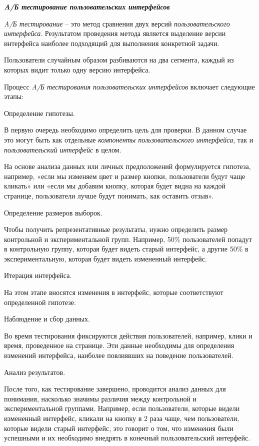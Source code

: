 {\textbf{\textit{A/Б тестирование пользовательских интерфейсов}}

\textit{A/Б тестирование} -- это метод сравнения двух версий \textit{пользовательского интерфейса}. Результатом проведения метода является выделение версии интерфейса наиболее подходящий для выполнения конкретной задачи.

Пользователи случайным образом разбиваются на два сегмента, каждый из которых видит только одну версию интерфейса.

Процесс \textit{A/Б тестирования пользовательских интерфейсов} включает следующие этапы:

\begin{textitemize}
	\item Определение гипотезы. 
	
	В первую очередь необходимо определить цель для проверки. В данном случае это могут быть как отдельные \textit{компоненты пользовательского интерфейса}, так и \textit{пользовательский интерфейс} в целом.
	
	На основе анализа данных или личных предположений формулируется гипотеза, например, «если мы изменяем цвет и размер кнопки, пользователи будут чаще кликать» или «если мы добавим кнопку, которая будет видна на каждой странице, пользователи лучше будут понимать, как оставить отзыв».
	
	\item Определение размеров выборок. 
	
	Чтобы получить репрезентативные результаты, нужно определить размер контрольной и экспериментальной групп. Например, 50\% пользователей попадут в контрольную группу, которая будет видеть старый интерфейс, а другие 50\% в экспериментальную, которая будет видеть измененный интерфейс.
	
	\item Итерация интерфейса. 
	
	На этом этапе вносятся изменения в интерфейс, которые соответствуют определенной гипотезе. 
	
	\item Наблюдение и сбор данных. 
	
	Во время тестирования фиксируются действия пользователей, например, клики и время, проведенное на странице. Эти данные необходимы для определения изменений интерфейса, наиболее повлиявших на поведение пользователей.
	
	\item Анализ результатов. 
	
	После того, как тестирование завершено, проводится анализ данных для понимания, насколько значимы различия между контрольной и экспериментальной группами. Например, если пользователи, которые видели измененный интерфейс, кликали на кнопку в 2 раза чаще, чем пользователи, которые видели старый интерфейс, это говорит о том, что изменения были успешными и их необходимо внедрять в конечный пользовательский интерфейс.
\end{textitemize}

}
